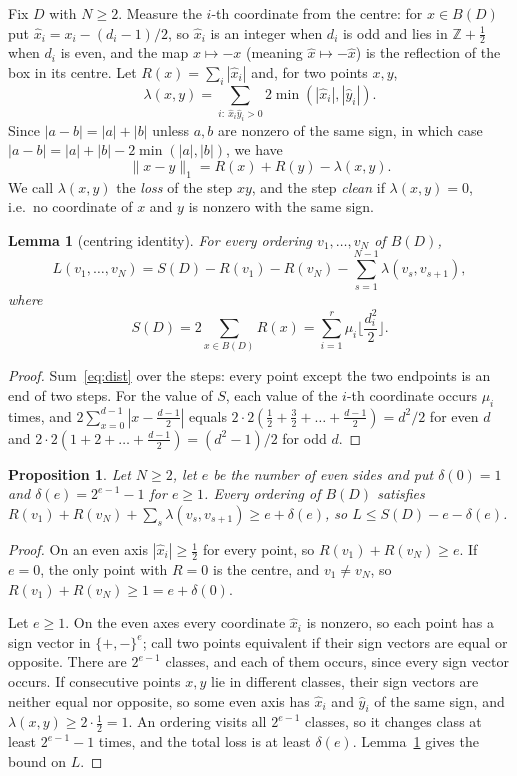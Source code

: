 \documentclass[11pt]{article}
\newtheorem{lemma}{Lemma}
\newtheorem{proposition}{Proposition}
\theoremstyle{remark}
\begin{document}
Fix $D$ with $N\ge2$. Measure the $i$-th coordinate from the centre: for
$x\in B(D)$ put $\hat x_i=x_i-(d_i-1)/2$, so $\hat x_i$ is an integer when
$d_i$ is odd and lies in $\mathbb Z+\frac12$ when $d_i$ is even, and the map
$x\mapsto-x$ (meaning $\hat x\mapsto-\hat x$) is the reflection of the box in
its centre. Let $R(x)=\sum_i|\hat x_i|$ and, for two points $x,y$,
\[
\lambda(x,y)=\sum_{i:\ \hat x_i\hat y_i>0}2\min(|\hat x_i|,|\hat y_i|).
\]
Since $|a-b|=|a|+|b|$ unless $a,b$ are nonzero of the same sign, in which case
$|a-b|=|a|+|b|-2\min(|a|,|b|)$, we have
\begin{equation}\label{eq:dist}
\|x-y\|_1=R(x)+R(y)-\lambda(x,y).
\end{equation}
We call $\lambda(x,y)$ the \emph{loss} of the step $xy$, and the step
\emph{clean} if $\lambda(x,y)=0$, i.e.\ no coordinate of $x$ and $y$ is
nonzero with the same sign.

\begin{lemma}[centring identity]\label{lem:centre}
For every ordering $v_1,\dots,v_N$ of $B(D)$,
\[
L(v_1,\dots,v_N)=S(D)-R(v_1)-R(v_N)-\sum_{s=1}^{N-1}\lambda(v_s,v_{s+1}),
\]
where
\[
S(D)=2\sum_{x\in B(D)}R(x)=\sum_{i=1}^r\mu_i\Big\lfloor\frac{d_i^2}{2}\Big\rfloor.
\]
\end{lemma}

\begin{proof}
Sum~\eqref{eq:dist} over the steps: every point except the two endpoints is
an end of two steps. For the value of $S$, each value of the $i$-th coordinate
occurs $\mu_i$ times, and $2\sum_{x=0}^{d-1}|x-\frac{d-1}2|$ equals
$2\cdot2(\frac12+\frac32+\dots+\frac{d-1}2)=d^2/2$ for even $d$ and
$2\cdot2(1+2+\dots+\frac{d-1}2)=(d^2-1)/2$ for odd $d$.
\end{proof}

\begin{proposition}\label{prop:upper}
Let $N\ge2$, let $e$ be the number of even sides and put $\delta(0)=1$ and
$\delta(e)=2^{e-1}-1$ for $e\ge1$. Every ordering of $B(D)$ satisfies
$R(v_1)+R(v_N)+\sum_s\lambda(v_s,v_{s+1})\ge e+\delta(e)$, so
$L\le S(D)-e-\delta(e)$.
\end{proposition}

\begin{proof}
On an even axis $|\hat x_i|\ge\frac12$ for every point, so
$R(v_1)+R(v_N)\ge e$. If $e=0$, the only point with $R=0$ is the centre, and
$v_1\ne v_N$, so $R(v_1)+R(v_N)\ge1=e+\delta(0)$.

Let $e\ge1$. On the even axes every coordinate $\hat x_i$ is nonzero, so each
point has a sign vector in $\{+,-\}^e$; call two points equivalent if their
sign vectors are equal or opposite. There are $2^{e-1}$ classes, and each of
them occurs, since every sign vector occurs. If consecutive points $x,y$ lie in
different classes, their sign vectors are neither equal nor opposite, so some
even axis has $\hat x_i$ and $\hat y_i$ of the same sign, and
$\lambda(x,y)\ge2\cdot\frac12=1$. An ordering visits all $2^{e-1}$ classes, so
it changes class at least $2^{e-1}-1$ times, and the total loss is at least
$\delta(e)$. Lemma~\ref{lem:centre} gives the bound on $L$.
\end{proof}
\end{document}
